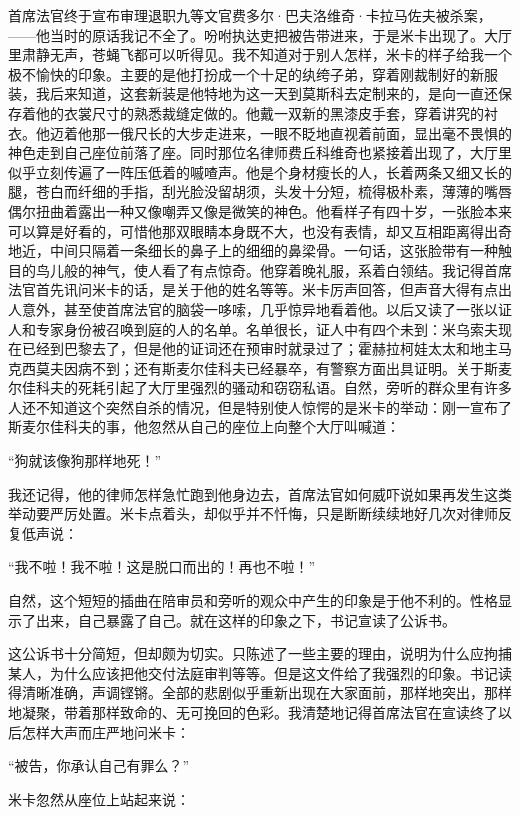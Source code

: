 \par 首席法官终于宣布审理退职九等文官费多尔·巴夫洛维奇·卡拉马佐夫被杀案，——他当时的原话我记不全了。吩咐执达吏把被告带进来，于是米卡出现了。大厅里肃静无声，苍蝇飞都可以听得见。我不知道对于别人怎样，米卡的样子给我一个极不愉快的印象。主要的是他打扮成一个十足的纨绔子弟，穿着刚裁制好的新服装，我后来知道，这套新装是他特地为这一天到莫斯科去定制来的，是向一直还保存着他的衣裳尺寸的熟悉裁缝定做的。他戴一双新的黑漆皮手套，穿着讲究的衬衣。他迈着他那一俄尺长的大步走进来，一眼不眨地直视着前面，显出毫不畏惧的神色走到自己座位前落了座。同时那位名律师费丘科维奇也紧接着出现了，大厅里似乎立刻传遍了一阵压低着的嘁喳声。他是个身材瘦长的人，长着两条又细又长的腿，苍白而纤细的手指，刮光脸没留胡须，头发十分短，梳得极朴素，薄薄的嘴唇偶尔扭曲着露出一种又像嘲弄又像是微笑的神色。他看样子有四十岁，一张脸本来可以算是好看的，可惜他那双眼睛本身既不大，也没有表情，却又互相距离得出奇地近，中间只隔着一条细长的鼻子上的细细的鼻梁骨。一句话，这张脸带有一种触目的鸟儿般的神气，使人看了有点惊奇。他穿着晚礼服，系着白领结。我记得首席法官首先讯问米卡的话，是关于他的姓名等等。米卡厉声回答，但声音大得有点出人意外，甚至使首席法官的脑袋一哆嗦，几乎惊异地看着他。以后又读了一张以证人和专家身份被召唤到庭的人的名单。名单很长，证人中有四个未到：米乌索夫现在已经到巴黎去了，但是他的证词还在预审时就录过了；霍赫拉柯娃太太和地主马克西莫夫因病不到；还有斯麦尔佳科夫已经暴卒，有警察方面出具证明。关于斯麦尔佳科夫的死耗引起了大厅里强烈的骚动和窃窃私语。自然，旁听的群众里有许多人还不知道这个突然自杀的情况，但是特别使人惊愕的是米卡的举动：刚一宣布了斯麦尔佳科夫的事，他忽然从自己的座位上向整个大厅叫喊道：
\par “狗就该像狗那样地死！”
\par 我还记得，他的律师怎样急忙跑到他身边去，首席法官如何威吓说如果再发生这类举动要严厉处置。米卡点着头，却似乎并不忏悔，只是断断续续地好几次对律师反复低声说：
\par “我不啦！我不啦！这是脱口而出的！再也不啦！”
\par 自然，这个短短的插曲在陪审员和旁听的观众中产生的印象是于他不利的。性格显示了出来，自己暴露了自己。就在这样的印象之下，书记宣读了公诉书。
\par 这公诉书十分简短，但却颇为切实。只陈述了一些主要的理由，说明为什么应拘捕某人，为什么应该把他交付法庭审判等等。但是这文件给了我强烈的印象。书记读得清晰准确，声调铿锵。全部的悲剧似乎重新出现在大家面前，那样地突出，那样地凝聚，带着那样致命的、无可挽回的色彩。我清楚地记得首席法官在宣读终了以后怎样大声而庄严地问米卡：
\par “被告，你承认自己有罪么？”
\par 米卡忽然从座位上站起来说：
